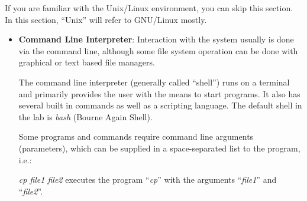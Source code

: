 If you are familiar with the Unix/Linux environment, you can skip this
section. In this section, ``Unix'' will refer to GNU/Linux mostly.

\begin{itemize}
\item
  \textbf{Command Line Interpreter}: Interaction with the system usually
  is done via the command line, although some file system operation can
  be done with graphical or text based file managers.

The command line interpreter (generally called ``shell'') runs on a
terminal and primarily provides the user with the means to start
programs. It also has several built in commands as well as a scripting
language. The default shell in the lab is \emph{bash} (Bourne Again
Shell).

Some programs and commands require command line arguments (parameters),
which can be supplied in a space-separated list to the program, i.e.:

\emph{cp file1 file2} executes the program ``\emph{cp}'' with the
arguments ``\emph{file1}'' and ``\emph{file2}''.


\end{itemize}
